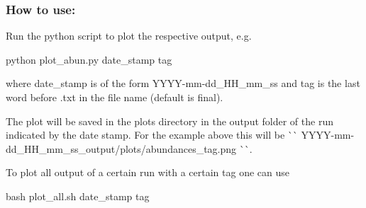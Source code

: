 \subsubsection*{How to use\+:}

Run the python script to plot the respective output, e.\+g.


\begin{DoxyCode}
python plot\_abun.py date\_stamp tag
\end{DoxyCode}
 where {\ttfamily date\+\_\+stamp} is of the form Y\+Y\+Y\+Y-\/mm-\/dd\+\_\+\+H\+H\+\_\+mm\+\_\+ss and {\ttfamily tag} is the last word before .txt in the file name (default is final).

The plot will be saved in the plots directory in the output folder of the run indicated by the date stamp. For the example above this will be \`{}\`{} Y\+Y\+Y\+Y-\/mm-\/dd\+\_\+\+H\+H\+\_\+mm\+\_\+ss\+\_\+output/plots/abundances\+\_\+tag.\+png \`{}\`{}.

To plot all output of a certain run with a certain tag one can use 
\begin{DoxyCode}
bash plot\_all.sh date\_stamp tag
\end{DoxyCode}
 
